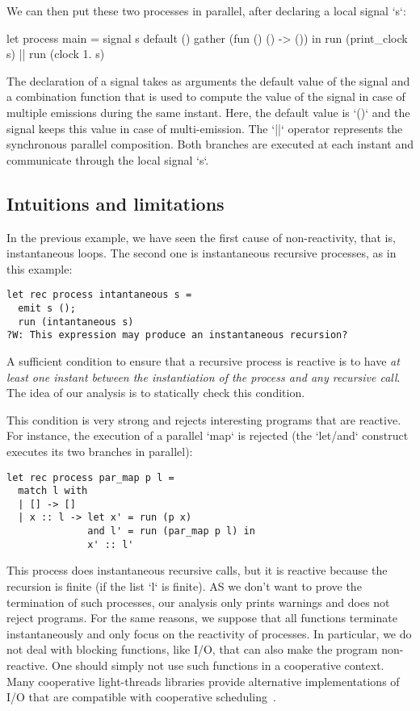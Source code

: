 \documentclass[9pt,preprint]{sigplanconf}
\begin{document}
We can then put these two processes in parallel, after declaring a local signal `s`:
\begin{rmlcl}[18]
let process main =
  signal s default () gather (fun () () -> ()) in
  run (print_clock s) || run (clock 1. s)
\end{rmlcl}
The declaration of a signal takes as arguments the default value of the signal and a combination function that is used to compute the value of the signal in case of multiple emissions during the same instant. Here, the default value is `()` and the signal keeps this value in case of multi-emission. The `||` operator represents the synchronous parallel composition. Both branches are executed at each instant and communicate through the local signal `s`.

\subsection{Intuitions and limitations}
\label{sec:intuition}



In the previous example, we have seen the first cause of non-reactivity, that is, instantaneous loops. The second one is instantaneous recursive processes, as in this example:
\begin{lstlisting}
let rec process intantaneous s =
  emit s ();
  run (intantaneous s)
?W: This expression may produce an instantaneous recursion?
\end{lstlisting}

A sufficient condition to ensure that a recursive process is reactive is to have \emph{at least one instant between the instantiation of the process and any recursive call}. The idea of our analysis is to statically check this condition.

This condition is very strong and rejects interesting programs that are reactive. For instance, the execution of a parallel `map` is rejected (the `let/and` construct executes its two branches in parallel):
\begin{lstlisting}
let rec process par_map p l =
  match l with
  | [] -> []
  | x :: l -> let x' = run (p x)
              and l' = run (par_map p l) in
              x' :: l'
\end{lstlisting}
This process does instantaneous recursive calls, but it is reactive because the recursion is finite (if the list `l` is finite). AS we don't want to prove the termination of such processes, our analysis only prints warnings and does not reject programs. For the same reasons, we suppose that all functions terminate instantaneously and only focus on the reactivity of processes. In particular, we do not deal with blocking functions, like I/O, that can also make the program non-reactive. One should simply not use such functions in a cooperative context. Many cooperative light-threads libraries provide alternative implementations of I/O that are compatible with cooperative scheduling~\cite{Vouillon:2008}.
\end{document}
